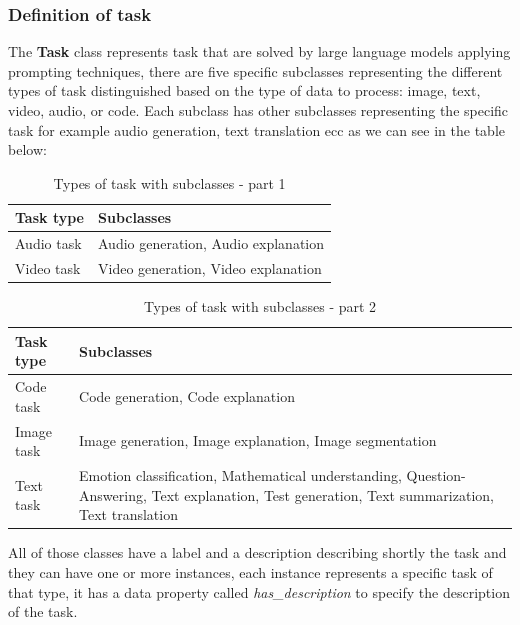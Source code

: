 \subsubsection{Definition of task}
The \textbf{Task} class represents task that are solved by large language models applying prompting techniques, there are five specific subclasses representing the different types of task distinguished based on the type of data to process: image, text, video, audio, or code. Each subclass has other subclasses representing the specific task for example audio generation, text translation ecc as we can see in the table below:
\begin{table}[H]
    \centering
    \begin{tabular}{|>{\raggedright\arraybackslash}p{6cm}|>{\raggedright\arraybackslash}p{6cm}|}
        \hline
        \textbf{Task type} & \textbf{Subclasses} \\ \hline
        Audio task & Audio generation, Audio explanation \\ \hline

        Video task & Video generation, Video explanation \\ \hline
    \end{tabular}
    \caption{Types of task with subclasses - part 1}
\end{table}

\begin{table}[H]
    \centering
    \begin{tabular}{|>{\raggedright\arraybackslash}p{6cm}|>{\raggedright\arraybackslash}p{6cm}|}
        \hline
        \textbf{Task type} & \textbf{Subclasses} \\ \hline
        Code task & Code generation, Code explanation \\ \hline

        Image task & Image generation, Image explanation, Image segmentation \\ \hline

        Text task & Emotion classification, Mathematical understanding, Question-Answering, Text explanation, Test generation, Text summarization, Text translation \\ \hline
    \end{tabular}
    \caption{Types of task with subclasses - part 2}
\end{table}
All of those classes have a label and a description describing shortly the task and they can have one or more instances, each instance represents a specific task of that type, it has a data property called \textit{has\_description} to specify the description of the task.

